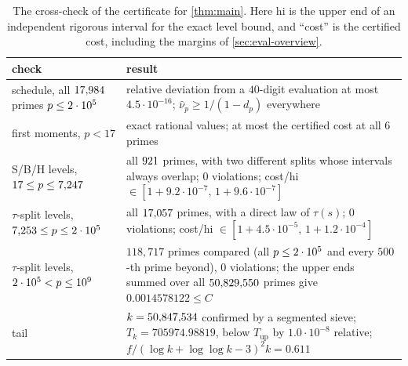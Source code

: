 \begin{table}[ht]
\centering
\caption{The cross-check of the certificate for \cref{thm:main}. Here $\mathrm{hi}$ is the upper end of an
independent rigorous interval for the exact level bound, and ``cost'' is the certified cost, including the margins of
\cref{sec:eval-overview}.}
\label{tab:xcheck-main}
\small
\begin{tabular}{@{}>{\raggedright\arraybackslash}p{}>{\raggedright\arraybackslash}p{}@{}}
\toprule
check & result\\
\midrule
schedule, all $17{,}984$ primes $p\le2\cdot 10^{5}$ & relative deviation from a $40$-digit evaluation at most $4.5\cdot10^{-16}$;
  $\hat\nu_p\ge1/(1-d_p)$ everywhere\\
first moments, $p<17$ & exact rational values; at most the certified cost at all $6$ primes\\
S/B/H levels, $17\le p\le7{,}247$ & all $921$ primes, with two different splits whose intervals always overlap;
  $0$ violations; cost/hi $\in[1+9.2\cdot10^{-7},\,1+9.6\cdot10^{-7}]$\\
$\tau$-split levels, $7{,}253\le p\le2\cdot 10^{5}$ & all $17{,}057$ primes, with a direct law of $\tau(s)$; $0$ violations;
  cost/hi $\in[1+4.5\cdot10^{-5},\,1+1.2\cdot10^{-4}]$\\
$\tau$-split levels, $2\cdot 10^{5}<p\le10^{9}$ & $118{,}717$ primes compared (all $p\le2\cdot 10^{5}$ and every $500$-th prime beyond),
  $0$ violations; the upper ends summed over all $50{,}829{,}550$ primes give $0.0014578122\le C$\\
tail & $k=50{,}847{,}534$ confirmed by a segmented sieve; $T_k=705974.98819$, below $T_{\mathrm{up}}$ by $1.0\cdot10^{-8}$
  relative; $f/(\log k+\log\log k-3)^2k=0.611$\\
\bottomrule
\end{tabular}
\end{table}

